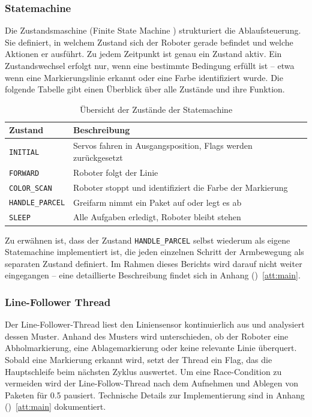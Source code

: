 \documentclass[11pt,a4paper]{article}
\begin{document}
	\subsubsection{Statemachine}
	\label{sss:statemachine}
	Die Zustandsmaschine (Finite State Machine \cite{fsm-wiki}) strukturiert die Ablaufsteuerung. Sie definiert, in welchem 
	Zustand sich der Roboter gerade befindet und welche Aktionen er ausführt. Zu jedem 
	Zeitpunkt ist genau ein Zustand aktiv. Ein Zustandswechsel erfolgt nur, wenn eine 
	bestimmte Bedingung erfüllt ist -- etwa wenn eine Markierungslinie erkannt oder eine 
	Farbe identifiziert wurde. Die folgende Tabelle gibt einen Überblick über alle 
	Zustände und ihre Funktion.
	
	\begin{table}[H]
		\centering
		\begin{tabular}{ll}
			\toprule
			\textbf{Zustand} & \textbf{Beschreibung} \\
			\midrule
			\texttt{INITIAL}        & Servos fahren in Ausgangsposition, Flags werden zurückgesetzt \\
			\texttt{FORWARD}        & Roboter folgt der Linie \\
			\texttt{COLOR\_SCAN}    & Roboter stoppt und identifiziert die Farbe der Markierung \\
			\texttt{HANDLE\_PARCEL} & Greifarm nimmt ein Paket auf oder legt es ab \\
			\texttt{SLEEP}          & Alle Aufgaben erledigt, Roboter bleibt stehen \\
			\bottomrule
		\end{tabular}
		\caption{Übersicht der Zustände der Statemachine}
		\label{tab:statemachine}
	\end{table}
	\noindent
	Zu erwähnen ist, dass der Zustand \texttt{HANDLE\_PARCEL} selbst wiederum als 
	eigene Statemachine implementiert ist, die jeden einzelnen Schritt der Armbewegung 
	als separaten Zustand definiert. Im Rahmen dieses Berichts wird darauf nicht weiter 
	eingegangen -- eine detaillierte Beschreibung findet sich in Anhang ()~\ref{att:main}.
	
	
	\subsubsection{Line-Follower Thread}
	
	Der Line-Follower-Thread liest den Liniensensor kontinuierlich aus und analysiert 
	dessen Muster. Anhand des Musters wird unterschieden, ob der Roboter eine 
	Abholmarkierung, eine Ablagemarkierung oder keine relevante Linie überquert. 
	Sobald eine Markierung erkannt wird, setzt der Thread ein Flag, das die Hauptschleife 
	beim nächsten Zyklus auswertet. Um eine Race-Condition zu vermeiden wird der Line-Follow-Thread nach dem Aufnehmen und Ablegen von Paketen für \SI{0.5}{\sec} pausiert. Technische Details zur Implementierung sind in 
	Anhang ()~\ref{att:main} dokumentiert.
	
\end{document}
